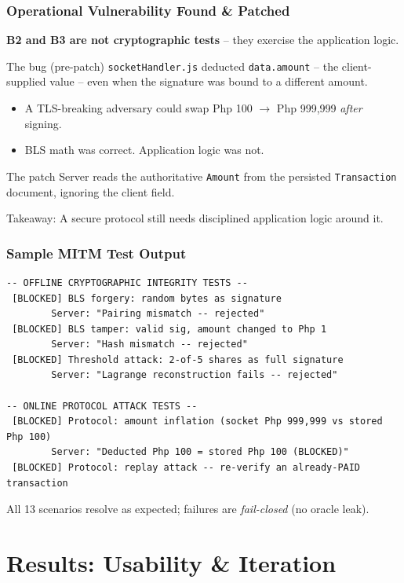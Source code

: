 \documentclass{beamer}
\newcommand{\HL}[1]{\textcolor{emphasis}{#1}}
\begin{document}
\begin{frame}
  \frametitle{Operational Vulnerability Found \& Patched}
  \textbf{B2 and B3 are not cryptographic tests} -- they exercise the application logic.
  \vspace{0.15cm}
  \begin{block}{The bug (pre-patch)}
    \texttt{socketHandler.js} deducted \texttt{data.amount} -- the \HL{client-supplied} value -- even when the signature was bound to a different amount.
  \end{block}
  \vspace{0.1cm}
  \begin{itemize}
    \item A TLS-breaking adversary could swap Php 100 $\rightarrow$ Php 999{,}999 \textit{after} signing.
    \item BLS math was correct. Application logic was not.
  \end{itemize}
  \begin{block}{The patch}
    Server reads the authoritative \texttt{Amount} from the persisted \texttt{Transaction} document, ignoring the client field.
  \end{block}
  \HL{Takeaway:} A secure protocol still needs disciplined application logic around it.
\end{frame}

\begin{frame}
  \frametitle{Sample MITM Test Output}
\begin{lstlisting}
-- OFFLINE CRYPTOGRAPHIC INTEGRITY TESTS --
 [BLOCKED] BLS forgery: random bytes as signature
        Server: "Pairing mismatch -- rejected"
 [BLOCKED] BLS tamper: valid sig, amount changed to Php 1
        Server: "Hash mismatch -- rejected"
 [BLOCKED] Threshold attack: 2-of-5 shares as full signature
        Server: "Lagrange reconstruction fails -- rejected"

-- ONLINE PROTOCOL ATTACK TESTS --
 [BLOCKED] Protocol: amount inflation (socket Php 999,999 vs stored Php 100)
        Server: "Deducted Php 100 = stored Php 100 (BLOCKED)"
 [BLOCKED] Protocol: replay attack -- re-verify an already-PAID transaction
\end{lstlisting}
  \vspace{0.05cm}
  \HL{All 13 scenarios resolve as expected}; failures are \textit{fail-closed} (no oracle leak).
\end{frame}

\section{Results: Usability \& Iteration}
\end{document}
